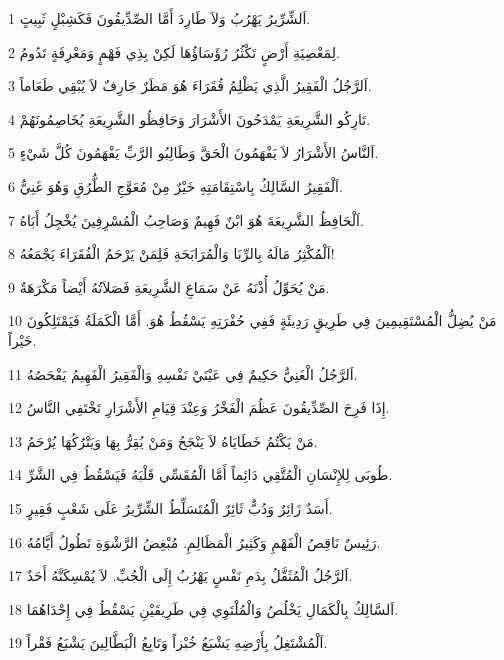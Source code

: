 \par 1 اَلشِّرِّيرُ يَهْرُبُ وَلاَ طَارِدَ أَمَّا الصِّدِّيقُونَ فَكَشِبْلٍ ثَبِيتٍ.
\par 2 لِمَعْصِيَةِ أَرْضٍ تَكْثُرُ رُؤَسَاؤُهَا لَكِنْ بِذِي فَهْمٍ وَمَعْرِفَةٍ تَدُومُ.
\par 3 اَلرَّجُلُ الْفَقِيرُ الَّذِي يَظْلِمُ فُقَرَاءَ هُوَ مَطَرٌ جَارِفٌ لاَ يُبْقِي طَعَاماً.
\par 4 تَارِكُو الشَّرِيعَةِ يَمْدَحُونَ الأَشْرَارَ وَحَافِظُو الشَّرِيعَةِ يُخَاصِمُونَهُمْ.
\par 5 اَلنَّاسُ الأَشْرَارُ لاَ يَفْهَمُونَ الْحَقَّ وَطَالِبُو الرَّبِّ يَفْهَمُونَ كُلَّ شَيْءٍ.
\par 6 اَلْفَقِيرُ السَّالِكُ بِاسْتِقَامَتِهِ خَيْرٌ مِنْ مُعَوَّجِ الطُّرُقِ وَهُوَ غَنِيٌّ.
\par 7 اَلْحَافِظُ الشَّرِيعَةَ هُوَ ابْنٌ فَهِيمٌ وَصَاحِبُ الْمُسْرِفِينَ يُخْجِلُ أَبَاهُ.
\par 8 اَلْمُكْثِرُ مَالَهُ بِالرِّبَا وَالْمُرَابَحَةِ فَلِمَنْ يَرْحَمُ الْفُقَرَاءَ يَجْمَعُهُ!
\par 9 مَنْ يُحَوِّلُ أُذْنَهُ عَنْ سَمَاعِ الشَّرِيعَةِ فَصَلاَتُهُ أَيْضاً مَكْرَهَةٌ.
\par 10 مَنْ يُضِلُّ الْمُسْتَقِيمِينَ فِي طَرِيقٍ رَدِيئَةٍ فَفِي حُفْرَتِهِ يَسْقُطُ هُوَ. أَمَّا الْكَمَلَةُ فَيَمْتَلِكُونَ خَيْراً.
\par 11 اَلرَّجُلُ الْغَنِيُّ حَكِيمٌ فِي عَيْنَيْ نَفْسِهِ وَالْفَقِيرُ الْفَهِيمُ يَفْحَصُهُ.
\par 12 إِذَا فَرِحَ الصِّدِّيقُونَ عَظُمَ الْفَخْرُ وَعِنْدَ قِيَامِ الأَشْرَارِ تَخْتَفِي النَّاسُ.
\par 13 مَنْ يَكْتُمُ خَطَايَاهُ لاَ يَنْجَحُ وَمَنْ يُقِرُّ بِهَا وَيَتْرُكُهَا يُرْحَمُ.
\par 14 طُوبَى لِلإِنْسَانِ الْمُتَّقِي دَائِماً أَمَّا الْمُقَسِّي قَلْبَهُ فَيَسْقُطُ فِي الشَّرِّ.
\par 15 أَسَدٌ زَائِرٌ وَدُبٌّ ثَائِرٌ الْمُتَسَلِّطُ الشِّرِّيرُ عَلَى شَعْبٍ فَقِيرٍ.
\par 16 رَئِيسٌ نَاقِصُ الْفَهْمِ وَكَثِيرُ الْمَظَالِمِ. مُبْغِضُ الرَّشْوَةِ تَطُولُ أَيَّامُهُ.
\par 17 اَلرَّجُلُ الْمُثَقَّلُ بِدَمِ نَفْسٍ يَهْرُبُ إِلَى الْجُبِّ. لاَ يُمْسِكَنَّهُ أَحَدٌ.
\par 18 اَلسَّالِكُ بِالْكَمَالِ يَخْلُصُ وَالْمُلْتَوِي فِي طَرِيقَيْنِ يَسْقُطُ فِي إِحْدَاهُمَا.
\par 19 اَلْمُشْتَغِلُ بِأَرْضِهِ يَشْبَعُ خُبْزاً وَتَابِعُ الْبَطَّالِينَ يَشْبَعُ فَقْراً.
